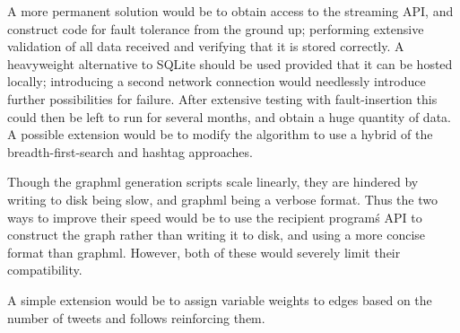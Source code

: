 A more permanent solution would be to obtain access to the streaming API, and construct code for fault tolerance from the ground up; performing extensive validation of all data received and verifying that it is stored correctly. A heavyweight alternative to SQLite should be used provided that it can be hosted locally; introducing a second network connection would needlessly introduce further possibilities for failure. After extensive testing with fault-insertion this could then be left to run for several months, and obtain a huge quantity of data. A possible extension would be to modify the algorithm to use a hybrid of the breadth-first-search and hashtag approaches.

Though the graphml generation scripts scale linearly, they are hindered by writing to disk being slow, and graphml being a verbose format. Thus the two ways to improve their speed would be to use the recipient program\'s API to construct the graph rather than writing it to disk, and using a more concise format than graphml. However, both of these would severely limit their compatibility.

A simple extension would be to assign variable weights to edges based on the number of tweets and follows reinforcing them.